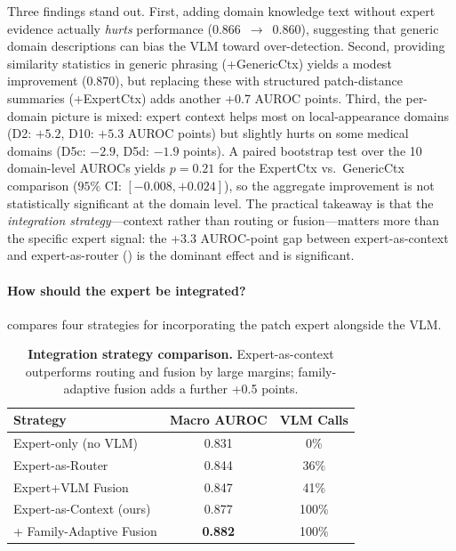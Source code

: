 Three findings stand out.
First, adding domain knowledge text without expert evidence actually \emph{hurts} performance (0.866~$\to$~0.860), suggesting that generic domain descriptions can bias the VLM toward over-detection.
Second, providing similarity statistics in generic phrasing (+GenericCtx) yields a modest improvement (0.870), but replacing these with structured patch-distance summaries (+ExpertCtx) adds another +0.7 AUROC points.
Third, the per-domain picture is mixed: expert context helps most on local-appearance domains (D2: $+5.2$, D10: $+5.3$ AUROC points) but slightly hurts on some medical domains (D5c: $-2.9$, D5d: $-1.9$ points).
A paired bootstrap test over the 10 domain-level AUROCs yields $p = 0.21$ for the ExpertCtx vs.\ GenericCtx comparison ($95\%$ CI: $[-0.008, +0.024]$), so the aggregate improvement is not statistically significant at the domain level.
The practical takeaway is that the \emph{integration strategy}---context rather than routing or fusion---matters more than the specific expert signal: the +3.3 AUROC-point gap between expert-as-context and expert-as-router () is the dominant effect and is significant.

\paragraph{How should the expert be integrated?}
 compares four strategies for incorporating the patch expert alongside the VLM.

\begin{table}[t]
\centering
\caption{%
    \textbf{Integration strategy comparison.}
    Expert-as-context outperforms routing and fusion by large margins; family-adaptive fusion adds a further +0.5 points.
}
\label{tab:ablation_strategy}
\small
\begin{tabular}{@{}lcc@{}}
\toprule
Strategy & Macro AUROC & VLM Calls \\
\midrule
Expert-only (no VLM)      & 0.831 & 0\%   \\
Expert-as-Router           & 0.844 & 36\%  \\
Expert+VLM Fusion          & 0.847 & 41\%  \\
Expert-as-Context (ours)   & 0.877 & 100\% \\
+ Family-Adaptive Fusion   & \textbf{0.882} & 100\% \\
\bottomrule
\end{tabular}
\end{table}


